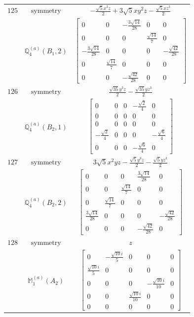 \documentclass[fleqn,8pt,landscape]{jsarticle}
\begin{document}
\begin{longtable}{ccc}
$ 125 $ & $ \text{symmetry} $ & $ - \frac{\sqrt{5} x^{3} z}{2} + 3 \sqrt{5} x y^{2} z - \frac{\sqrt{5} x z^{3}}{2} $ \\
$  $ & $ \mathbb{Q}_{4}^{(a)}(B_{1},2) $ & $ \begin{bmatrix} 0 & 0 & - \frac{3 \sqrt{14}}{28} & 0 & 0 \\ 0 & 0 & 0 & \frac{\sqrt{14}}{7} & 0 \\ - \frac{3 \sqrt{14}}{28} & 0 & 0 & 0 & - \frac{\sqrt{42}}{28} \\ 0 & \frac{\sqrt{14}}{7} & 0 & 0 & 0 \\ 0 & 0 & - \frac{\sqrt{42}}{28} & 0 & 0 \end{bmatrix} $ \\ \hline
$ 126 $ & $ \text{symmetry} $ & $ \frac{\sqrt{35} y^{3} z}{2} - \frac{\sqrt{35} y z^{3}}{2} $ \\
$  $ & $ \mathbb{Q}_{4}^{(a)}(B_{2},1) $ & $ \begin{bmatrix} 0 & 0 & 0 & - \frac{\sqrt{2}}{4} & 0 \\ 0 & 0 & 0 & 0 & 0 \\ 0 & 0 & 0 & 0 & 0 \\ - \frac{\sqrt{2}}{4} & 0 & 0 & 0 & - \frac{\sqrt{6}}{4} \\ 0 & 0 & 0 & - \frac{\sqrt{6}}{4} & 0 \end{bmatrix} $ \\ \hline
$ 127 $ & $ \text{symmetry} $ & $ 3 \sqrt{5} x^{2} y z - \frac{\sqrt{5} y^{3} z}{2} - \frac{\sqrt{5} y z^{3}}{2} $ \\
$  $ & $ \mathbb{Q}_{4}^{(a)}(B_{2},2) $ & $ \begin{bmatrix} 0 & 0 & 0 & \frac{3 \sqrt{14}}{28} & 0 \\ 0 & 0 & \frac{\sqrt{14}}{7} & 0 & 0 \\ 0 & \frac{\sqrt{14}}{7} & 0 & 0 & 0 \\ \frac{3 \sqrt{14}}{28} & 0 & 0 & 0 & - \frac{\sqrt{42}}{28} \\ 0 & 0 & 0 & - \frac{\sqrt{42}}{28} & 0 \end{bmatrix} $ \\ \hline
$ 128 $ & $ \text{symmetry} $ & $ z $ \\
$  $ & $ \mathbb{M}_{1}^{(a)}(A_{2}) $ & $ \begin{bmatrix} 0 & - \frac{\sqrt{10} i}{5} & 0 & 0 & 0 \\ \frac{\sqrt{10} i}{5} & 0 & 0 & 0 & 0 \\ 0 & 0 & 0 & - \frac{\sqrt{10} i}{10} & 0 \\ 0 & 0 & \frac{\sqrt{10} i}{10} & 0 & 0 \\ 0 & 0 & 0 & 0 & 0 \end{bmatrix} $ \\ \hline

\end{longtable}
\end{document}
